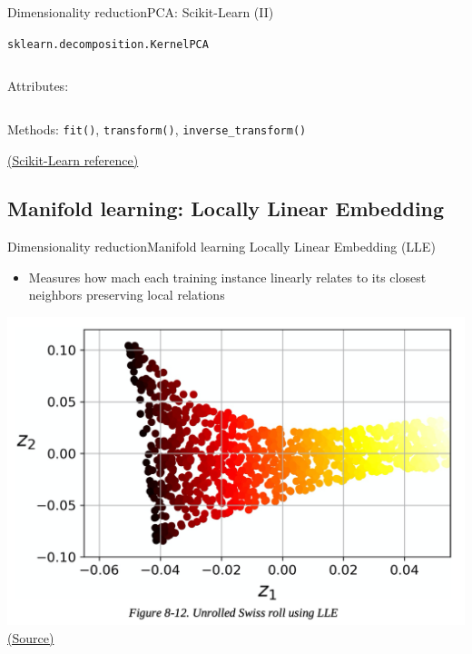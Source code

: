 \documentclass[10pt,compress]{beamer} %
\begin{document}
{\begin{frame}{Dimensionality reduction}{PCA: Scikit-Learn (II)}
\begin{exampleblock}{\texttt{sklearn.decomposition.KernelPCA}}
\begin{columns}[T]
                Attributes:
            \end{columns}

            \medskip

            Methods: \texttt{fit()}, \texttt{transform()}, \texttt{inverse\_transform()}
        \end{exampleblock}

        \medskip

        \centering \href{https://scikit-learn.org/stable/modules/generated/sklearn.decomposition.KernelPCA.html\#sklearn.decomposition.KernelPCA}{(Scikit-Learn reference)}

    \end{frame}
}{}

\subsection{Manifold learning: Locally Linear Embedding}
\begin{frame}{Dimensionality reduction}{Manifold learning}
	Locally Linear Embedding (LLE)
    \begin{itemize}
        \item  Measures how mach each training instance linearly relates to its closest neighbors preserving local relations
    \end{itemize}

	\includegraphics[width=0.7\linewidth]{figs/lle.png}
   	\centering \tiny{\href{https://github.com/Akramz/Hands-on-Machine-Learning-with-Scikit-Learn-Keras-and-TensorFlow/blob/master/08.Dim_Reduction.ipynb}{(Source)}}
\end{frame}
\end{document}
